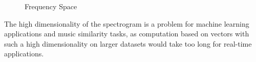 \begin{figure}[htbp]
	\centering
	\begin{subfigure}{0.5\textwidth}
		\centering
		\label{laylaspec}
	\end{subfigure}%
	\begin{subfigure}{0.5\textwidth}
		\centering
		\label{laylaspecfft}
	\end{subfigure}
	\caption{Frequency Space}
	\label{fig:test}
\end{figure}
\FloatBarrier
The high dimensionality of the spectrogram is a problem for machine learning applications and music similarity tasks, as computation based on vectors with such a high dimensionality on larger datasets would take too long for real-time applications.
